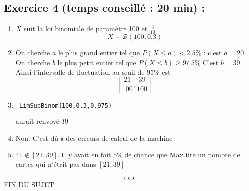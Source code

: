 \subsection*{Exercice 4 (temps conseillé : 20 min) : }
\begin{enumerate}
\item $X$ suit la loi binomiale de paramètre 100 et $\frac{3}{10}$ $$\boxed{X \sim \mathscr{B}(100,0.3)}$$
\item On cherche $a$ le plus grand entier tel que $P(X \leq a) < 2.5$\% : c'est $a=20$. On cherche $b$ le plus petit entier tel que $P(X \leq b) \geq 97.5$\% C'est $b=39$. Ainsi l'intervalle de fluctuation au seuil de 95\% est $$\left[\frac{21}{100},\frac{39}{100}\right]$$
\item
\begin{verbatim} LimSupBinom(100,0.3,0.975) \end{verbatim} aurait renvoyé $39$
\item Non. C'est dû à des erreurs de calcul de la machine
\item $41 \notin [21,39]$. Il y avait en fait 5\% de chance que Max tire un nombre de cartes qui n'était pas dans $[21,39]$
\end{enumerate}
$$\star \star \star$$
\center
FIN DU SUJET
